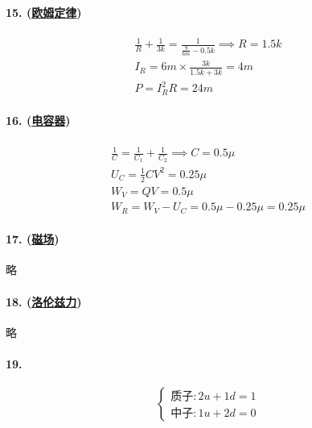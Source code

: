 \paragraph{15. (\hyperref[subsec:欧姆定律]{欧姆定律})}

\begin{gather*}
    \frac1R+\frac{1}{3k}=\frac{1}{\frac{9}{6m}-0.5k}\implies
    R=1.5k\\
    I_R=6m\times\frac{3k}{1.5k+3k}=4m\\
    P=I_R^2R=24m
\end{gather*}

\paragraph{16. (\hyperref[subsec:电容器]{电容器})}

\begin{gather*}
    \frac1C=\frac1{C_1}+\frac1{C_2}\implies C=0.5\mu\\
    U_C=\frac12CV^2=0.25\mu\\
    W_V=QV=0.5\mu\\
    W_R=W_V-U_C=0.5\mu-0.25\mu=0.25\mu
\end{gather*}

\paragraph{17. (\hyperref[subsec:磁场]{磁场})} 略
\paragraph{18. (\hyperref[subsec:洛伦兹力]{洛伦兹力})} 略
\paragraph{19.}

\begin{equation*}
    \begin{cases}
        \textrm{质子}:2u+1d=1\\
        \textrm{中子}:1u+2d=0
    \end{cases}
\end{equation*}
